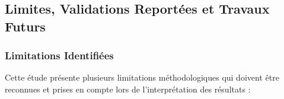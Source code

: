 


\subsection{Limites, Validations Reportées et Travaux Futurs}
\label{sec:limites_travaux_futurs}


\subsubsection{Limitations Identifiées}
\label{subsec:limitations_identifiees}
Cette étude présente plusieurs limitations méthodologiques qui doivent être reconnues et prises en compte lors de l'interprétation des résultats :

